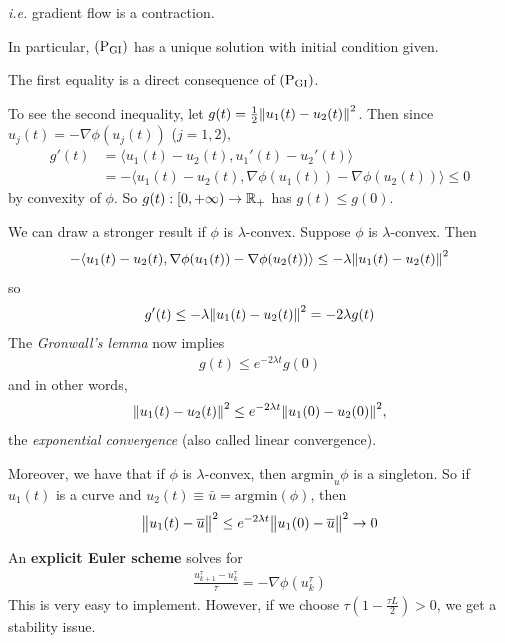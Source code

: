 \documentclass[12pt,a4paper]{article}
\newenvironment{proof}
{\begin{changemargin}{1cm}{0.5cm} 
	}%
	{\end{changemargin}
}
\newenvironment{p}
{\begin{proof} 
	}%
	{\end{proof}
}
\begin{document}
\textit{i.e.} gradient flow is a contraction.

\quad In particular, $(\text{P}_{\text{GI}})$ has a unique solution with initial condition given.
\begin{p}
\pf The first equality is a direct consequence of $(\text{P}_{\text{GI}})$.

\quad To see the second inequality, let $g(t) = \frac{1}{2} \snorms{u_1(t) - u_2(t)}{}^2$. Then since $u_j(t) = -\nabla \phi(u_j(t))$ ($j=1,2$),
\begin{align*}
g'(t) &= \langle u_1(t) - u_2(t), u_1'(t) - u_2'(t) \rangle \\
&= - \langle u_1(t)- u_2(t) , \nabla \phi(u_1(t)) - \nabla \phi(u_2(t)) \rangle \leq 0
\end{align*}
by convexity of $\phi$. So $g(t) : [0, + \infty) \rightarrow \mathbb{R}_+$ has $g(t) \leq g(0)$.

\eop
\end{p}
\s

We can draw a stronger result if $\phi$ is $\lambda$-convex. Suppose $\phi$ is $\lambda$-convex. Then 
\begin{align*}
-\langle u_1(t) - u_2(t) , \nabla \phi(u_1(t)) - \nabla \phi(u_2(t)) \rangle \leq - \lambda \snorms{u_1(t) - u_2(t)}{}^2
\end{align*}
so
\begin{align*}
g'(t) \leq - \lambda \snorms{u_1(t) - u_2(t)}{}^2 = -2\lambda g(t)
\end{align*}
The \emph{Gronwall's lemma} now implies
\begin{align*}
g(t) \leq e^{-2\lambda t}g(0)
\end{align*}
and in other words,
\begin{align*}
\snorms{u_1(t) - u_2(t)}{}^2 \leq e^{-2\lambda t} \snorms{u_1(0)- u_2(0)}{}^2,
\end{align*}
the \emph{exponential convergence} (also called linear convergence).
\s

Moreover, we have that if $\phi$ is $\lambda$-convex, then $\text{argmin}_u \phi$ is a singleton. So if $u_1(t)$ is a curve and $u_2(t) \equiv \bar{u} =\text{argmin}(\phi)$, then
\begin{align*}
\bigl\lVert u_1(t) - \overline{u}\bigr\rVert_{}^2 \leq e^{-2\lambda t}\bigl\lVert u_1(0)- \overline{u}\bigr\rVert_{}^2\rightarrow 0
\end{align*}
\s

 An \textbf{explicit Euler scheme} solves for
\begin{align*}
\frac{u^{\tau}_{k+1} - u^{\tau}_k}{\tau} = - \nabla \phi(u_k^{\tau})
\end{align*}
This is very easy to implement. However, if we choose $\tau(1- \frac{\tau L}{2})>0$, we get a stability issue.
\end{document}
